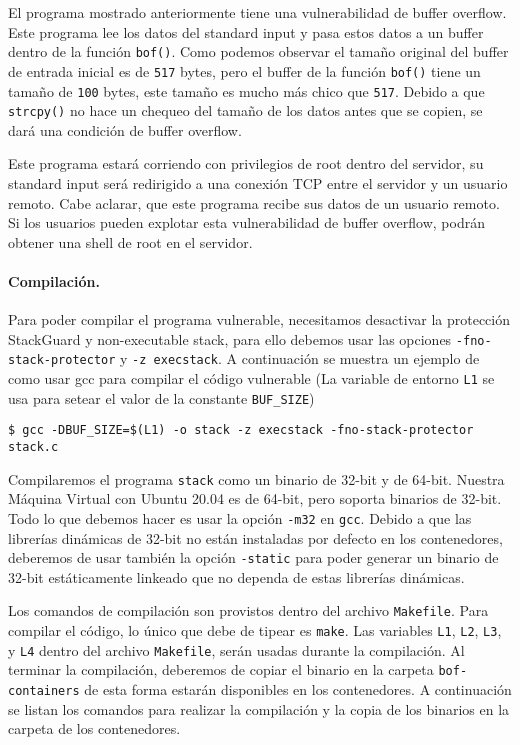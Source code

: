 El programa mostrado anteriormente tiene una vulnerabilidad de buffer overflow. Este programa lee los datos del standard input y pasa estos datos a un buffer dentro de la función {\tt bof()}. Como podemos observar el tamaño original del buffer de entrada inicial es de \texttt{517} bytes, pero el buffer de la función {\tt bof()} tiene un tamaño de \texttt{100} bytes, este tamaño es mucho más chico que \texttt{517}. Debido a que {\tt strcpy()} no hace un chequeo del tamaño de los datos antes que se copien, se dará una condición de buffer overflow.

Este programa estará corriendo con privilegios de root dentro del servidor, su standard input será redirigido a una conexión TCP entre el servidor y un usuario remoto.
Cabe aclarar, que este programa recibe sus datos de un usuario remoto.
Si los usuarios pueden explotar esta vulnerabilidad de buffer overflow, podrán obtener una shell de root en el servidor.


\paragraph{Compilación.}
Para poder compilar el programa vulnerable, necesitamos desactivar la protección StackGuard y non-executable stack, para ello debemos usar las opciones \texttt{-fno-stack-protector} y \texttt{-z execstack}.
A continuación se muestra un ejemplo de como usar gcc para compilar el código vulnerable (La variable de entorno \texttt{L1} se usa para setear el valor de la constante \texttt{BUF\_SIZE})

\begin{lstlisting}
$ gcc -DBUF_SIZE=$(L1) -o stack -z execstack -fno-stack-protector stack.c
\end{lstlisting}

Compilaremos el programa \texttt{stack} como un binario de 32-bit y de 64-bit. Nuestra Máquina Virtual con Ubuntu 20.04 es de 64-bit, pero soporta binarios de 32-bit. Todo lo que debemos hacer es usar la opción \texttt{-m32} en \texttt{gcc}.
Debido a que las librerías dinámicas de 32-bit no están instaladas por defecto en los contenedores, deberemos de usar también la opción \texttt{-static} para poder generar un binario de 32-bit estáticamente linkeado que no dependa de estas librerías dinámicas.

Los comandos de compilación son provistos dentro del archivo \texttt{Makefile}. Para compilar el código, lo único que debe de tipear es \texttt{make}. Las variables \texttt{L1}, \texttt{L2}, \texttt{L3}, y \texttt{L4} dentro del archivo \texttt{Makefile}, serán usadas durante la compilación.
Al terminar la compilación, deberemos de copiar el binario en la carpeta \texttt{bof-containers} de esta forma estarán disponibles en los contenedores. 
A continuación se listan los comandos para realizar la compilación y la copia de los binarios en la carpeta de los contenedores.

